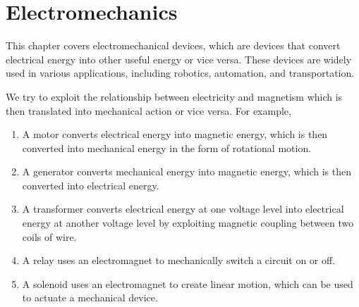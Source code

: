 \chapter{Electromechanics}\label{ch:electromechanics}

This chapter covers electromechanical devices, which are devices that
convert electrical energy into other useful energy or vice versa. These
devices are widely used in various applications, including robotics,
automation, and transportation.

We try to exploit the relationship between electricity and magnetism
which is then translated into mechanical action or vice versa. For example,
\begin{enumerate}
  \item A motor converts electrical energy into magnetic energy, which
    is then converted into mechanical energy in the form of rotational
    motion.
  \item A generator converts mechanical energy into magnetic energy,
    which is then converted into electrical energy.
  \item A transformer converts electrical energy at one voltage level
    into electrical energy at another voltage level by exploiting
    magnetic coupling between two coils of wire.
  \item A relay uses an electromagnet to mechanically switch a
    circuit on or off.
  \item A solenoid uses an electromagnet to create linear motion,
    which can be used to actuate a mechanical device.
\end{enumerate}


